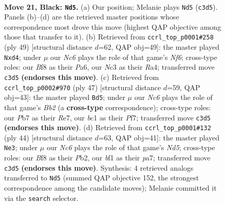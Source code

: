\documentclass[11pt]{article}
\begin{document}
\clearpage

\begin{figure}[p]\centering
\begin{subfigure}{0.46\textwidth}\centering
\resizebox{\linewidth}{!}{%
\newchessgame
\chessboard[
  setfen={rk3b1r/pp5p/8/2P1pP2/PP6/2n5/8/R1B1KB1R b KQ - 0 21},
  showmover=false,
  pgfstyle=straightmove, color=movearrow, markmove={c3-d5}
]}
\caption{}
\end{subfigure}\hfill
\begin{subfigure}{0.46\textwidth}\centering
\resizebox{\linewidth}{!}{%
\newchessgame
\chessboard[
  setfen={5rk1/5ppp/p7/8/r2P2P1/5n1P/P4P2/R1BR1K2 b - - 2 25},
  showmover=false,
  pgfstyle=straightmove, color=movearrow, markmove={f3-d4}
]}
\caption{}
\end{subfigure}
\\[4pt]
\begin{subfigure}{0.46\textwidth}\centering
\resizebox{\linewidth}{!}{%
\newchessgame
\chessboard[
  setfen={5r1k/1b2rppp/1p2p3/4P3/8/8/P1BR1PPP/1R4K1 b - - 1 24},
  showmover=false,
  pgfstyle=straightmove, color=movearrow, markmove={b7-d5}
]}
\caption{}
\end{subfigure}\hfill
\begin{subfigure}{0.46\textwidth}\centering
\resizebox{\linewidth}{!}{%
\newchessgame
\chessboard[
  setfen={5b2/p2k1p2/1pr2p2/3N3r/3P4/8/PP3P1P/3R1K1R w - - 0 23},
  showmover=false,
  pgfstyle=straightmove, color=movearrow, markmove={d5-e3}
]}
\caption{}
\end{subfigure}
\caption{\textbf{Move 21, Black: \texttt{Nd5}.} (a) Our position; Melanie plays \texttt{Nd5} (\texttt{c3d5}). Panels (b)--(d) are the retrieved master positions whose correspondence most drove this move (highest QAP objective among those that transfer to it). (b) Retrieved from \texttt{ccrl\_top\_p0001\#258} (ply 49) [structural distance $d$=62, QAP obj=49]: the master played \texttt{Nxd4}; under $\mu$ our \emph{Nc6} plays the role of that game's \emph{Nf6}; cross-type roles: our \emph{B}f8 as their \emph{P}a6, our \emph{N}c3 as their \emph{R}a4; transferred move \texttt{c3d5} \textbf{(endorses this move)}. (c) Retrieved from \texttt{ccrl\_top\_p0002\#970} (ply 47) [structural distance $d$=59, QAP obj=43]: the master played \texttt{Bd5}; under $\mu$ our \emph{Nc6} plays the role of that game's \emph{Bb2} (a \textbf{cross-type} correspondence); cross-type roles: our \emph{P}b7 as their \emph{R}e7, our \emph{b}c1 as their \emph{P}f7; transferred move \texttt{c3d5} \textbf{(endorses this move)}. (d) Retrieved from \texttt{ccrl\_top\_p0001\#132} (ply 44) [structural distance $d$=63, QAP obj=41]: the master played \texttt{Ne3}; under $\mu$ our \emph{Nc6} plays the role of that game's \emph{Nd5}; cross-type roles: our \emph{B}f8 as their \emph{P}b2, our \emph{b}f1 as their \emph{p}a7; transferred move \texttt{c3d5} \textbf{(endorses this move)}. Synthesis: 4 retrieved analogs transferred to \texttt{Nd5} (summed QAP objective 152, the strongest correspondence among the candidate moves); Melanie committed it via the \texttt{search} selector.}
\label{fig:thought-m41}
\end{figure}
\end{document}
